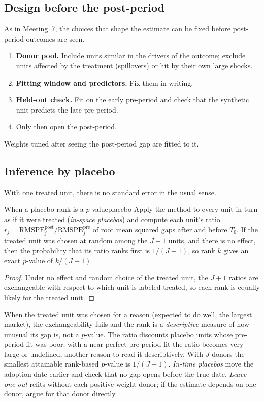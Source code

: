 \documentclass[11pt]{article}
\begin{document}
\subsection{Design before the post-period}

As in Meeting~7, the choices that shape the estimate can be fixed before post-period outcomes are seen.
\begin{enumerate}
  \item \textbf{Donor pool.} Include units similar in the drivers of the outcome; exclude units affected by the treatment (spillovers) or hit by
  their own large shocks.
  \item \textbf{Fitting window and predictors.} Fix them in writing.
  \item \textbf{Held-out check.} Fit on the early pre-period and check that the synthetic unit predicts the late pre-period.
  \item Only then open the post-period.
\end{enumerate}
Weights tuned after seeing the post-period gap are fitted to it.

\subsection{Inference by placebo}

With one treated unit, there is no standard error in the usual sense.

\begin{prop}{When a placebo rank is a $p$-value}{placebo}
Apply the method to every unit in turn as if it were treated (\emph{in-space placebos}) and compute each unit's ratio
$r_j = \text{RMSPE}^{\text{post}}_j/\text{RMSPE}^{\text{pre}}_j$ of root mean squared gaps after and before $T_0$. If the treated unit was chosen at
random among the $J+1$ units, and there is no effect, then the probability that its ratio ranks first is $1/(J+1)$, so rank $k$ gives an exact
$p$-value of $k/(J+1)$.
\end{prop}
\begin{proof}
Under no effect and random choice of the treated unit, the $J+1$ ratios are exchangeable with respect to which unit is labeled treated, so each rank
is equally likely for the treated unit.
\end{proof}

When the treated unit was chosen for a reason (expected to do well, the largest market), the exchangeability fails and the rank is a
\emph{descriptive} measure of how unusual its gap is, not a $p$-value. The ratio discounts placebo units whose pre-period fit was poor; with a
near-perfect pre-period fit the ratio becomes very large or undefined, another reason to read it descriptively. With $J$ donors the smallest
attainable rank-based $p$-value is $1/(J+1)$. \emph{In-time placebos} move the adoption date earlier and check that no gap opens before the true
date. \emph{Leave-one-out} refits without each positive-weight donor; if the estimate depends on one donor, argue for that donor directly.
\end{document}

